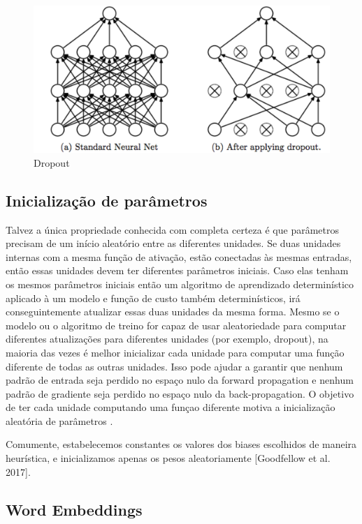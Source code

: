 \documentclass[12pt]{article}
\begin{document}
\begin{figure}[!htb]
\centering
\includegraphics[width=.8\textwidth]{images/dropout.png}
\caption{Dropout}
\label{fig:dropout}
\end{figure}

\subsection{Inicialização de parâmetros}

Talvez a única propriedade conhecida com completa certeza é que parâmetros precisam de um início aleatório entre as diferentes unidades. Se duas unidades internas com a mesma função de ativação, estão conectadas às mesmas entradas, então essas unidades devem ter diferentes parâmetros iniciais. Caso elas tenham os mesmos parâmetros iniciais então um algoritmo de aprendizado determinístico aplicado à um modelo e função de custo também determinísticos, irá conseguintemente atualizar essas duas unidades da mesma forma. Mesmo se o modelo ou o algoritmo de treino for capaz de usar aleatoriedade para computar diferentes atualizações para diferentes unidades (por exemplo, dropout), na maioria das vezes é melhor inicializar cada unidade para computar uma função diferente de todas as outras unidades. Isso pode ajudar a garantir que nenhum padrão de entrada seja perdido no espaço nulo da forward propagation e nenhum padrão de gradiente seja perdido no espaço nulo da back-propagation. O objetivo de ter cada unidade computando uma funçao diferente motiva a inicialização aleatória de parâmetros \cite{Goodfellow-et-al-2016}.

Comumente, estabelecemos constantes os valores dos biases escolhidos de maneira heurística, e inicializamos apenas os pesos aleatoriamente [Goodfellow et al. 2017].

\subsection{Word Embeddings}
\end{document}
